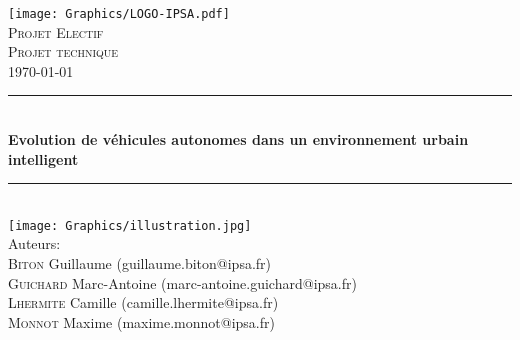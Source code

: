 
\begin{titlepage}

\newcommand{\HRule}{\rule{\linewidth}{0.5mm}} %

\center %
 

\texttt{[image: Graphics/LOGO-IPSA.pdf]}\\[1.5cm]

\textsc{\Large Projet Electif}\\[0.5cm] %
\textsc{\large Projet technique}\\[0.5cm] %

{\normalsize \today}\\[1.5cm]


\HRule \\[0.4cm]
{ \Large \bfseries Evolution de véhicules autonomes dans un environnement urbain intelligent}\\[0.4cm] %
\HRule \\[2.5cm]



 \texttt{[image: Graphics/illustration.jpg]}\\[2.5cm]

{\normalsize Auteurs:}\\
\small
\textsc{Biton} Guillaume (guillaume.biton@ipsa.fr)\\
\textsc{Guichard} Marc-Antoine \small(marc-antoine.guichard@ipsa.fr)\\
\textsc{Lhermite} Camille \small(camille.lhermite@ipsa.fr)\\
\textsc{Monnot} Maxime \small(maxime.monnot@ipsa.fr)\\[1cm]

 

\vfill %

\restoregeometry

\end{titlepage}